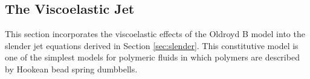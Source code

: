 \documentclass[11pt]{article}
\begin{document}
\subsection{The Viscoelastic Jet}
This section incorporates the viscoelastic effects of the Oldroyd B model \cite{oldroyd1950formulation} into the slender jet equations derived in Section \ref{sec:slender}. This constitutive model is one of the simplest models for polymeric fluids in which polymers are described by Hookean bead spring dumbbells.

%
\end{document}
